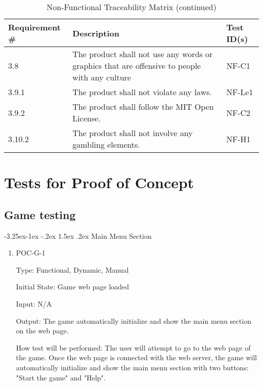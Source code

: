 \documentclass[12pt, titlepage]{article}
\makeatletter
\renewcommand\paragraph{\@startsection{paragraph}{4}{\z@}%
                                     {-3.25ex\@plus -1ex \@minus -.2ex}%
                                     {1.5ex \@plus .2ex}%
                                     {\normalfont\normalsize\bfseries}}
\makeatother
\begin{document}
\begin{table}[h!]
\centering
\caption{Non-Functional Traceability Matrix (continued)}
\label{table:1}
\begin{tabular}{|p{2.5cm} p{10cm} p{2.5cm}|} 
 \hline
 Requirement \# & Description & Test ID(s) \\ 
 \hline
 3.8 & The product shall not use any words or graphics that are offensive to people with any culture & NF-C1 \\
 3.9.1 & The product shall not violate any laws. & NF-Le1 \\
 3.9.2 & The product shall follow the MIT Open License. & NF-C2 \\
 3.10.2 &  The product shall not involve any gambling elements. & NF-H1 \\
 \hline
\end{tabular}
\end{table}



\section{Tests for Proof of Concept}

\subsection{Game testing}
		
\paragraph{Main Menu Section}

\begin{enumerate}

\item{POC-G-1\\}

Type: Functional, Dynamic, Manual
					
Initial State: Game web page loaded
					
Input: N/A 
					
Output: The game automatically initialize and show the main menu section on the web page.
					
How test will be performed: The user will attempt to go to the web page of the game. Once the web page is connected with the web server, the game will automatically initialize and show the main menu section with two buttons: "Start the game" and "Help".

\end{enumerate}
\end{document}
